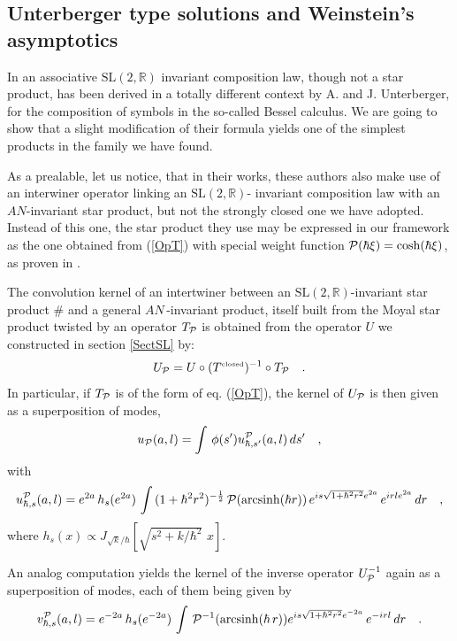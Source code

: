 \documentclass{article}
\newcommand{\SL}{\mbox{SL}(2,\mathbb{R})}
\begin{document}
\subsection{Unterberger type solutions and Weinstein's asymptotics}\label{Unterberger}
In \cite{Unt,Unt2} an associative $\SL$ invariant composition law, though not a star product, has been derived  in a totally different context by A.
and J. Unterberger, for the composition of symbols in the so-called Bessel calculus. We are going to show that a slight modification of their formula yields one of the simplest products in the family we have found.

\noindent As a prealable, let us notice, that in their works, these authors also make use of an interwiner operator linking an $\SL$- invariant composition law with an $AN$-invariant star product, but not the strongly closed one we have adopted. Instead of this one, the star product they use may be expressed in our framework as the one  obtained from (\ref{OpT}) with special weight function  ${\cal P}(\hbar \xi)=\cosh (\hbar \xi)$, as proven in \cite{BielMassar2}. 
\par\noindent The
convolution kernel of an intertwiner between an $\SL$-invariant star product $\#$ and a general
$AN\,$-invariant product, itself built from the Moyal star product twisted by an operator $T_{\cal P}$ is obtained from the operator $U$ we constructed in section \ref{SectSL} by:
\begin{equation}\label{fromone}
 U_{\cal P} = U  \circ (T^{{\mbox{\tiny{\rm closed}}}})^{-1} \circ T_{\cal P} \quad .
 \end{equation}
In particular, if $T_{\cal P}$ is of the form of eq. (\ref{OpT}), the kernel of $U_{\cal P}$ is then given as a superposition of modes,
\begin{equation}\label{ugenkernel}
 u_{\cal P} (a,l) = \int \, \phi(s') u^{\cal P}_{\hbar,s'}(a,l) \, ds' \quad , 
\end{equation}
with 
 \begin{equation}\label{uGenP}
u^{\cal P}_{\hbar,s}(a,l) =  e^{2a} \, h_s( e^{2a})\, \int \,
(1+\hbar^2 r^2)^{-\frac{1}{2}}\,{\cal P}({\rm arcsinh}(\hbar r))\, e^{ i s \sqrt{1+
\hbar^2 r^2} e^{2a}} \, e^{i r l e^{2a}} \, dr \quad,
\end{equation}
where $h_s(x)\propto  J_{
{\sqrt{k}}/{\hbar}}[\sqrt{s^2+ {k} /{\hbar^2}}\,\,
x] $.
 
\noindent An analog computation yields the kernel of the inverse operator $U^{-1}_{\cal P}$ 
again as a superposition of modes, each of them being given by 
\begin{equation} 
v^{\cal P}_{\hbar,s}(a,l) = e^{-2a} \, h_s( e^{-2a})\, \int
\, {\cal P}^{-1}({\rm arcsinh}(\hbar\,r)) e^{ i s \sqrt{1+\hbar^2
r^2} e^{-2a}} \, e^{-i r l} \, dr \quad .
\end{equation}
\end{document}
